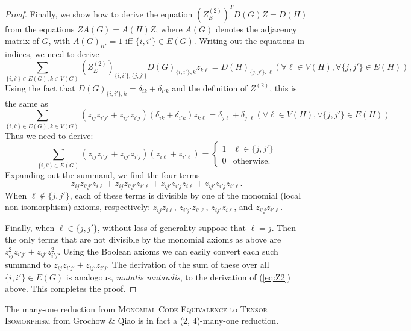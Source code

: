 \begin{proof}
Finally, we show how to derive the equation $(Z^{(2)}_E)^T D(G) Z = D(H)$ from the equations $ZA(G) = A(H) Z$, where $A(G)$ denotes the adjacency matrix of $G$, with $A(G)_{ii'} = 1$ iff $\{i,i'\} \in E(G)$. Writing out the equations in indices, we need to derive
\[
\sum_{\{i,i'\} \in E(G),k \in V(G)} \left(Z^{(2)}_{E}\right)_{\{i,i'\},\{j,j'\}} D(G)_{\{i,i'\}, k} z_{k \ell} = D(H)_{\{j,j'\},\ell} (\forall \ell \in V(H), \forall \{j,j'\} \in E(H))
\]
Using the fact that $D(G)_{\{i,i'\},k} = \delta_{ik} + \delta_{i'k}$ and the definition of $Z^{(2)}$, this is the same as
\[
\sum_{\{i,i'\} \in E(G),k \in V(G)} \left(z_{ij} z_{i'j'} + z_{ij'} z_{i'j} \right) (\delta_{ik} + \delta_{i'k}) z_{k \ell} = \delta_{j\ell} + \delta_{j'\ell} (\forall \ell \in V(H), \forall \{j,j'\} \in E(H))
\]
Thus we need to derive:
\[
\sum_{\{i,i'\} \in E(G)} \left(z_{ij} z_{i'j'} + z_{ij'} z_{i'j} \right) (z_{i \ell}  + z_{i' \ell})= \begin{cases}
1 & \ell \in \{j,j'\} \\
0 & \text{otherwise}.
\end{cases}
\]
Expanding out the summand, we find the four terms
\[
z_{ij} z_{i'j'} z_{i\ell} + z_{ij} z_{i'j'} z_{i' \ell} + z_{ij'} z_{i'j} z_{i\ell} + z_{ij'} z_{i'j} z_{i'\ell}.
\]
When $\ell \notin \{j,j'\}$, each of these terms is divisible by one of the monomial (local non-isomorphism) axioms, respectively: $z_{ij} z_{i\ell}$, $z_{i'j'} z_{i'\ell}$, $z_{ij'} z_{i\ell}$, and $z_{i'j} z_{i'\ell}$.

Finally, when $\ell \in \{j,j'\}$, without loss of generality suppose that $\ell = j$. Then the only terms that are not divisible by the monomial axioms as above are $z_{ij}^2 z_{i'j'} + z_{ij'} z_{i'j}^2$. Using the Boolean axioms we can easily convert each such summand to $z_{ij} z_{i'j'} + z_{ij'} z_{i'j}$. The derivation of the sum of these over all $\{i,i'\} \in E(G)$ is analogous, \emph{mutatis mutandis}, to the derivation of (\ref{eq:Z2}) above. This completes the proof.
\end{proof}


\begin{proposition} \label{prop:MonTI}
The many-one reduction from \textsc{Monomial Code Equivalence} to \textsc{Tensor Isomorphism} from Grochow \& Qiao \cite{GQ2} is in fact a (2, 4)-many-one reduction.
\end{proposition}


